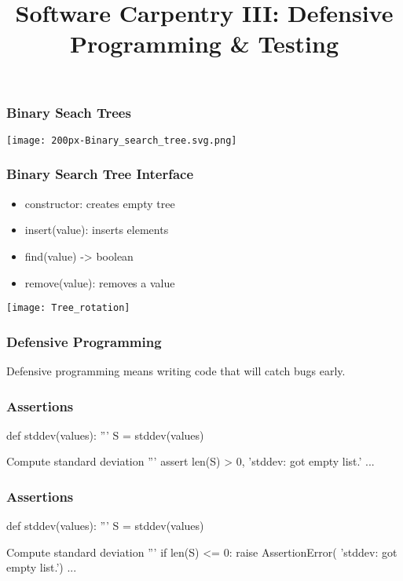 
\title{Software Carpentry III: Defensive Programming \& Testing}

\frame{\maketitle}

\begin{frame}[fragile]
\frametitle{Binary Seach Trees}

\centering
\texttt{[image: 200px-Binary\_search\_tree.svg.png]}

\end{frame}

\begin{frame}[fragile]
\frametitle{Binary Search Tree Interface}

\begin{itemize}
\item constructor: creates empty tree
\item insert(value): inserts elements
\item find(value) -> boolean
\item remove(value): removes a value
\end{itemize}
\end{frame}

\begin{frame}[fragile]

\centering
\texttt{[image: Tree\_rotation]}

\end{frame}

\begin{frame}[fragile]
\frametitle{Defensive Programming}

Defensive programming means writing code that will catch bugs early.
\end{frame}

\begin{frame}[fragile]
\frametitle{Assertions}
\begin{python}
def stddev(values):
    '''
    S = stddev(values)

    Compute standard deviation
    '''
    assert len(S) > 0, 'stddev: got empty list.'
    ...
\end{python}
\end{frame}

\begin{frame}[fragile]
\frametitle{Assertions}

\begin{python}
def stddev(values):
    '''
    S = stddev(values)

    Compute standard deviation
    '''
    if len(S) <= 0:
        raise AssertionError(
            'stddev: got empty list.')
    ...
\end{python}

\end{frame}

